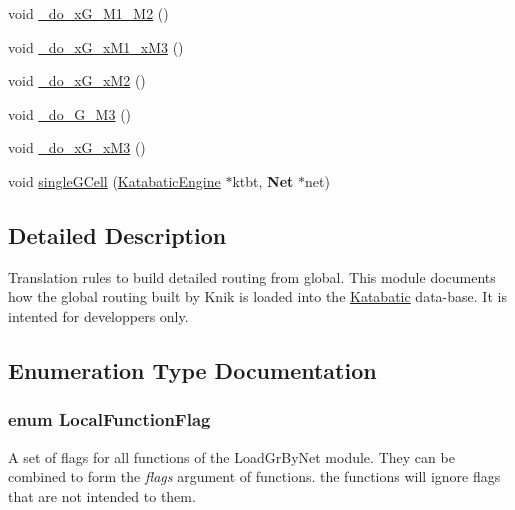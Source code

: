 \begin{DoxyCompactItemize}
void \hyperlink{group__LoadGlobalRouting_gae60ed4e27ad89a1e2ff2cd6415ef33f1}{\-\_\-do\-\_\-x\-G\-\_\-M1\-\_\-M2} ()
\item 
void \hyperlink{group__LoadGlobalRouting_gaf9b009520f54099668ac9d12f2c85257}{\-\_\-do\-\_\-x\-G\-\_\-x\-M1\-\_\-x\-M3} ()
\item 
void \hyperlink{group__LoadGlobalRouting_ga532d1c6b530e0375078ea2d6ea3c6024}{\-\_\-do\-\_\-x\-G\-\_\-x\-M2} ()
\item 
void \hyperlink{group__LoadGlobalRouting_ga2519ef984b3d19f123827a9b12651672}{\-\_\-do\-\_\-G\-\_\-M3} ()
\item 
void \hyperlink{group__LoadGlobalRouting_ga007efc725aae31782204a44949765cb4}{\-\_\-do\-\_\-x\-G\-\_\-x\-M3} ()
\item 
void \hyperlink{group__LoadGlobalRouting_ga3973291866b39c10cea5ca17f7d174fb}{single\-G\-Cell} (\hyperlink{classKatabatic_1_1KatabaticEngine}{Katabatic\-Engine} $\ast$ktbt, {\bf Net} $\ast$net)
\end{DoxyCompactItemize}


\subsection{Detailed Description}
Translation rules to build detailed routing from global. This module documents how the global routing built by {\ttfamily Knik} is loaded into the {\ttfamily \hyperlink{namespaceKatabatic}{Katabatic}} data-\/base. It is intented for developpers only. 

\subsection{Enumeration Type Documentation}
\hypertarget{group__LoadGlobalRouting_gaec07c7f30c801c3b0f72193757250d64}{
\subsubsection[{Local\-Function\-Flag}]{\setlength{\rightskip}{0pt plus 5cm}enum Local\-Function\-Flag}}\label{group__LoadGlobalRouting_gaec07c7f30c801c3b0f72193757250d64}
A set of flags for all functions of the Load\-Gr\-By\-Net module. They can be combined to form the {\itshape flags} argument of functions. the functions will ignore flags that are not intended to them.

